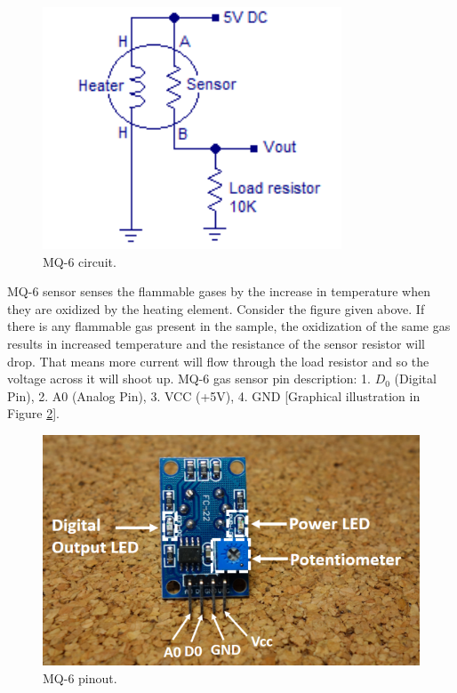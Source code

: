 \begin{figure}[h]
  \centering
  \includegraphics[width=3.5in]{4}
  \caption{MQ-6 circuit.}\label{fig4}
\end{figure}

MQ-6 sensor senses the flammable gases by the increase in temperature when they are oxidized by the heating element. Consider the figure given above. If there is any flammable gas present in the sample, the oxidization of the same gas results in increased temperature and the resistance of the sensor resistor will drop. That means more current will flow through the load resistor and so the voltage across it will shoot up. MQ-6 gas sensor pin description: 1. $D_0$ (Digital Pin), 2. A0 (Analog Pin), 3. VCC (+5V), 4. GND [Graphical illustration in Figure \ref{fig5}].

\begin{figure}[h]
  \centering
  \includegraphics[width=5in]{5}
  \caption{MQ-6 pinout.}\label{fig5}
\end{figure}

